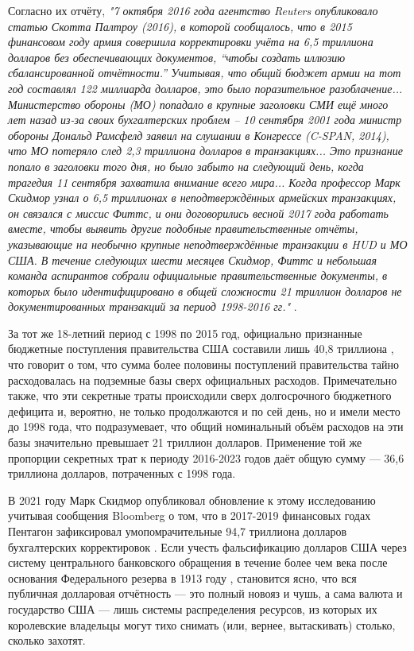 \documentclass[10pt,twocolumn,letterpaper]{article}
\begin{document}
Согласно их отчёту, \textit{"7 октября 2016 года агентство Reuters опубликовало статью Скотта Палтроу (2016), в которой сообщалось, что в 2015 финансовом году армия совершила корректировки учёта на 6,5 триллиона долларов без обеспечивающих документов, “чтобы создать иллюзию сбалансированной отчётности.” Учитывая, что общий бюджет армии на тот год составлял 122 миллиарда долларов, это было поразительное разоблачение... Министерство обороны (МО) попадало в крупные заголовки СМИ ещё много лет назад из-за своих бухгалтерских проблем – 10 сентября 2001 года министр обороны Дональд Рамсфелд заявил на слушании в Конгрессе (C-SPAN, 2014), что МО потеряло след 2,3 триллиона долларов в транзакциях... Это признание попало в заголовки того дня, но было забыто на следующий день, когда трагедия 11 сентября захватила внимание всего мира... Когда профессор Марк Скидмор узнал о 6,5 триллионах в неподтверждённых армейских транзакциях, он связался с миссис Фиттс, и они договорились весной 2017 года работать вместе, чтобы выявить другие подобные правительственные отчёты, указывающие на необычно крупные неподтверждённые транзакции в HUD и МО США. В течение следующих шести месяцев Скидмор, Фиттс и небольшая команда аспирантов собрали официальные правительственные документы, в которых было идентифицировано в общей сложности 21 триллион долларов не документированных транзакций за период 1998-2016 гг."} \cite{12}.

За тот же 18-летний период с 1998 по 2015 год, официально признанные бюджетные поступления правительства США составили лишь 40{,}8 триллиона \cite{15}, что говорит о том, что сумма более половины поступлений правительства тайно расходовалась на подземные базы сверх официальных расходов. Примечательно также, что эти секретные траты происходили сверх долгосрочного бюджетного дефицита и, вероятно, не только продолжаются и по сей день, но и имели место до 1998 года, что подразумевает, что общий номинальный объём расходов на эти базы значительно превышает 21 триллион долларов. Применение той же пропорции секретных трат к периоду 2016-2023 годов даёт общую сумму — 36,6 триллиона долларов, потраченных с 1998 года.

В 2021 году Марк Скидмор опубликовал обновление к этому исследованию учитывая сообщения Bloomberg о том, что в 2017-2019 финансовых годах Пентагон зафиксировал умопомрачительные 94,7 триллиона долларов бухгалтерских корректировок \cite{17,18}. Если учесть фальсификацию долларов США через систему центрального банковского обращения в течение более чем века после основания Федерального резерва в 1913 году \cite{37}, становится ясно, что вся публичная долларовая отчётность — это полный новояз и чушь, а сама валюта и государство США — лишь системы распределения ресурсов, из которых их королевские владельцы могут тихо снимать (или, вернее, вытаскивать) столько, сколько захотят.
\end{document}
